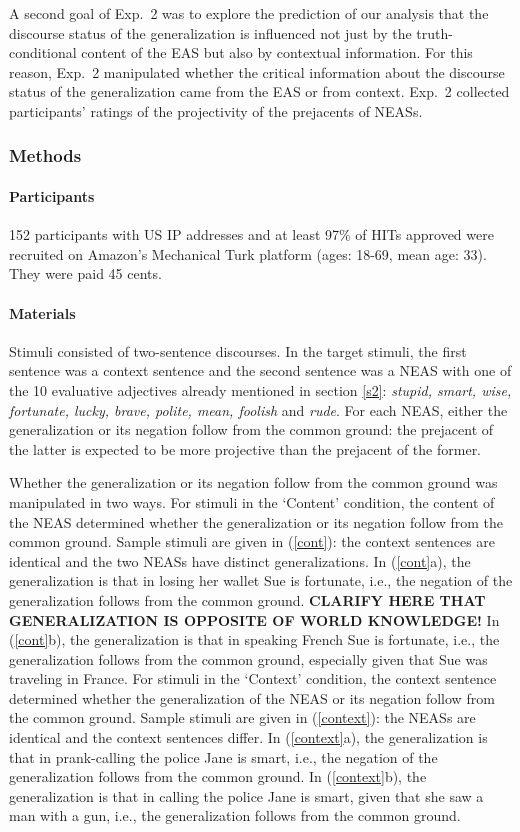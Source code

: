 \documentclass[11pt,fleqn]{article}
\newcommand{\6}{\mbox{$[\hspace*{-.6mm}[$}}
\newcommand{\9}{\mbox{$]\hspace*{-.6mm}]$}}
\begin{document}
A second goal of Exp.~2 was to explore the prediction of our analysis that the discourse status of the generalization is influenced not just by the truth-conditional content of the EAS but also by contextual information. For this reason, Exp.~2 manipulated whether the critical information about the discourse status of the generalization came from the EAS or from context. Exp.~2 collected participants' ratings of the projectivity of the prejacents of NEASs.

\subsubsection{Methods}

\paragraph{Participants} 152 participants with US IP addresses and at least 97\% of HITs approved were recruited on Amazon's Mechanical Turk platform (ages: 18-69, mean age: 33). They were paid 45 cents.

\paragraph{Materials} Stimuli consisted of two-sentence discourses. In the target stimuli, the first sentence was a context sentence and the second sentence was a NEAS with one of the 10 evaluative adjectives already mentioned in section \ref{s2}: {\em stupid, smart, wise, fortunate, lucky, brave, polite, mean, foolish} and {\em rude}. For each NEAS, either the generalization or its negation follow from the common ground: the prejacent of the latter is expected to be more projective than the prejacent of the former.

Whether the generalization or its negation follow from the common ground was manipulated in two ways. For stimuli in the `Content' condition, the content of the NEAS determined whether the generalization or its negation follow from the common ground. Sample stimuli are given in (\ref{cont}): the context sentences are identical and the two NEASs have distinct generalizations. In (\ref{cont}a), the generalization is that in losing her wallet Sue is fortunate, i.e., the negation of the generalization follows from the common ground. {\bf CLARIFY HERE THAT GENERALIZATION IS OPPOSITE OF WORLD KNOWLEDGE!} In (\ref{cont}b), the generalization is that in speaking French Sue is fortunate,  i.e., the generalization follows from the common ground, especially given that Sue was traveling in France. For stimuli in the `Context' condition, the context sentence determined whether the generalization of the NEAS or its negation follow from the common ground. Sample stimuli are given in (\ref{context}): the NEASs are identical and the context sentences differ. In (\ref{context}a), the generalization is that in prank-calling the police Jane is smart, i.e., the negation of the generalization follows from the common ground. In (\ref{context}b), the generalization is that in calling the police Jane is smart, given that she saw a man with a gun, i.e., the generalization follows from the common ground.
\end{document}
